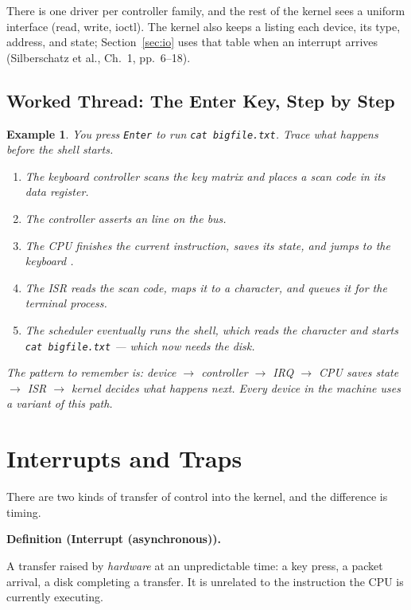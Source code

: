 \documentclass[11pt]{article}
\newtheorem{example}{Example}
\newenvironment{definitionbox}[1]{%
  \par\noindent\textbf{Definition (#1).}\ \itshape
}{\par\vspace{0.3em}}
\begin{document}
There is one driver per controller family, and the rest of the kernel sees a uniform interface (read, write, ioctl). The kernel also keeps a  listing each device, its type, address, and state; Section~\ref{sec:io} uses that table when an interrupt arrives (Silberschatz et al., Ch.~1, pp.~6--18).

\subsection{Worked Thread: The Enter Key, Step by Step}

\begin{example}
You press \texttt{Enter} to run \texttt{cat bigfile.txt}. Trace what happens before the shell starts.

\begin{enumerate}
  \item The keyboard controller scans the key matrix and places a scan code in its data register.
  \item The controller asserts an  line on the bus.
  \item The CPU finishes the current instruction, saves its state, and jumps to the keyboard .
  \item The ISR reads the scan code, maps it to a character, and queues it for the terminal process.
  \item The scheduler eventually runs the shell, which reads the character and starts \texttt{cat bigfile.txt} --- which now needs the disk.
\end{enumerate}

The pattern to remember is: device $\to$ controller $\to$ IRQ $\to$ CPU saves state $\to$ ISR $\to$ kernel decides what happens next. Every device in the machine uses a variant of this path.
\end{example}

\section{Interrupts and Traps}

There are two kinds of transfer of control into the kernel, and the difference is timing.

\begin{definitionbox}{Interrupt (asynchronous)}
A transfer raised by \emph{hardware} at an unpredictable time: a key press, a packet arrival, a disk completing a transfer. It is unrelated to the instruction the CPU is currently executing.
\end{definitionbox}
\end{document}
